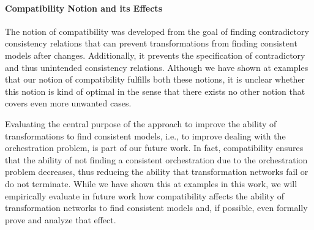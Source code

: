 

\paragraph{Compatibility Notion and its Effects}
The notion of compatibility was developed from the goal of finding contradictory consistency relations that can prevent transformations from finding consistent models after changes.
Additionally, it prevents the specification of contradictory and thus unintended consistency relations.
Although we have shown at examples that our notion of compatibility fulfills both these notions, it is unclear whether this notion is kind of optimal in the sense that there exists no other notion that covers even more unwanted cases.


Evaluating the central purpose of the approach to improve the ability of transformations to find consistent models, i.e., to improve dealing with the orchestration problem, is part of our future work.
In fact, compatibility ensures that the ability of not finding a consistent orchestration due to the orchestration problem decreases, thus reducing the ability that transformation networks fail or do not terminate.
While we have shown this at examples in this work, we will empirically evaluate in future work how compatibility affects the ability of transformation networks to find consistent models and, if possible, even formally prove and analyze that effect. 



